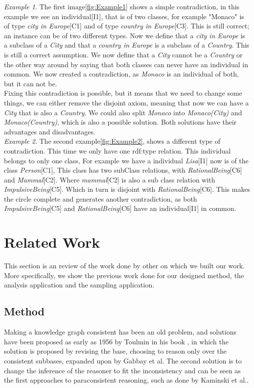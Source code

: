 \documentclass[11pt,letterpaper ,oneside ]{book}
\begin{document}
	\textit{Example 1}. The first image\ref{fig:Example1} shows a simple contradiction, in this example we see an individual[I1], that is of two classes, for example "Monaco" is of type \textit{city in Europe}[C1] and of type \textit{country in Europe}[C3]. This is still correct; an instance can be of two different types. Now we define that a \textit{city in Europe} is a subclass of a \textit{City} and that a \textit{country in Europe} is a subclass of a \textit{Country}. This is still a correct assumption. We now define that a \textit{City} cannot be a \textit{Country} or the other way around by saying that both classes can never have an individual in common. We now created a contradiction, as \textit{Monaco} is an individual of both, but it can not be.\\
	
	Fixing this contradiction is possible, but it means that we need to change some things, we can either remove the disjoint axiom, meaning that now we can have a \textit{City} that is also a \textit{Country}. We could also split \textit{Monaco} into \textit{Monaco(City)} and \textit{Monaco(Country)}, which is also a possible solution. Both solutions have their advantages and disadvantages.\\
	
	\textit{Example 2}. The second example\ref{fig:Example2}, shows a different type of contradiction. This time we only have one rdf:type relation. This individual belongs to only one class, For example we have a individual \textit{Lisa}[I1] now is of the class \textit{Person}[C1], This class has two subClass relations, with \textit{RationalBeing}[C6] and \textit{Mammal}[C2]. Where \textit{mammal}[C2] is also a sub class relation with \textit{ImpulsiveBeing}[C5]. Which in turn is disjoint with \textit{RationalBeing}[C6]. This makes the circle complete and generates another contradiction, as both \textit{ImpulsiveBeing}[C5] and \textit{RationalBeing}[C6] have an individual[I1] in common. \\
	
	
	\chapter{Related Work}\label{RelatedWork}
	This section is an review of the work done by other on which we built our work. More specifically, we show the previous work done for our designed method, the analysis application and the sampling application. 
	
	\section{Method}
	Making a knowledge graph consistent has been an old problem, and solutions have been proposed as early as 1956 by Toulmin in his book \cite{toulmin:1956}, in which the solution is proposed by revising the base, choosing to reason only over the consistent subbases, expanded upon by Gabbay et al\cite{Gabbay:1994}. The second solution is to change the inference of the reasoner to fit the inconsistency and can be seen as the first approaches to paraconsistent reasoning, such as done by Kaminski et al.\cite{Kaminski:2015}.
	
\end{document}
